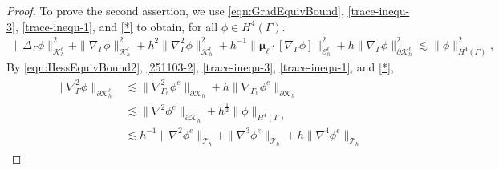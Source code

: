 \documentclass[10pt, a4paper]{amsart}
\newcommand{\bn}{{\bm n}}
\newcommand{\nab}{\nabla}
\newcommand{\bmu}{{\bm \mu}}
\newcommand{\calT}{\mathcal{T}}
\newcommand{\calE}{\mathcal{E}}
\newcommand{\calF}{\mathcal{F}}
\newcommand{\calK}{\mathcal{K}}
\theoremstyle{definition}
\theoremstyle{remark}
\theoremstyle{example}
\numberwithin{equation}{section}
\begin{document}
\begin{proof}
To prove the second assertion,
we use \eqref{eqn:GradEquivBound}, \eqref{trace-inequ-3}, \eqref{trace-inequ-1}, and \eqref{*} 
to obtain, for all $\phi\in H^4(\Gamma)$.
%
\begin{align}
\|\Delta_{\Gamma}\phi\|_{\calK^\ell_h}^2 + \|\nab_{\Gamma}\phi\|_{\calK^\ell_h}^2 + h^2\|\nab_{\Gamma}^2\phi\|_{\calK^\ell_h}^2 + h^{-1}\|\bmu_{\ell} \cdot [\nab_{\Gamma}\phi]\|_{\calE^\ell_h}^2
+h\|\nab_{\Gamma}\phi\|_{\partial\calK_h^\ell}^2
\lesssim \|\phi\|_{H^4(\Gamma)}^2, \label{251103-2}
\end{align}
By \eqref{eqn:HessEquivBound2}, \eqref{251103-2}, \eqref{trace-inequ-3}, \eqref{trace-inequ-1}, and \eqref{*},
\begin{align}
\begin{split} \label{251103-5}
\|\nab_{\Gamma}^2\phi\|_{\partial\calK^\ell_h}
& \lesssim \|\nab_{\Gamma_h}^2\phi^e\|_{\partial\calK_h} + h\|\nab_{\Gamma_h}\phi^e\|_{\partial\calK_h} \\
& \lesssim \|\nab^2\phi^e\|_{\partial\calK_h} + h^{\frac{1}{2}}\|\phi\|_{H^4(\Gamma)} \\
& \lesssim h^{-1}\|\nab^2\phi^e\|_{\calT_h} + \|\nab^3\phi^e\|_{\calT_h}  + h\|\nab^4\phi^e\|_{\calT_h}

\end{split}
\end{align}
\end{proof}
\end{document}
